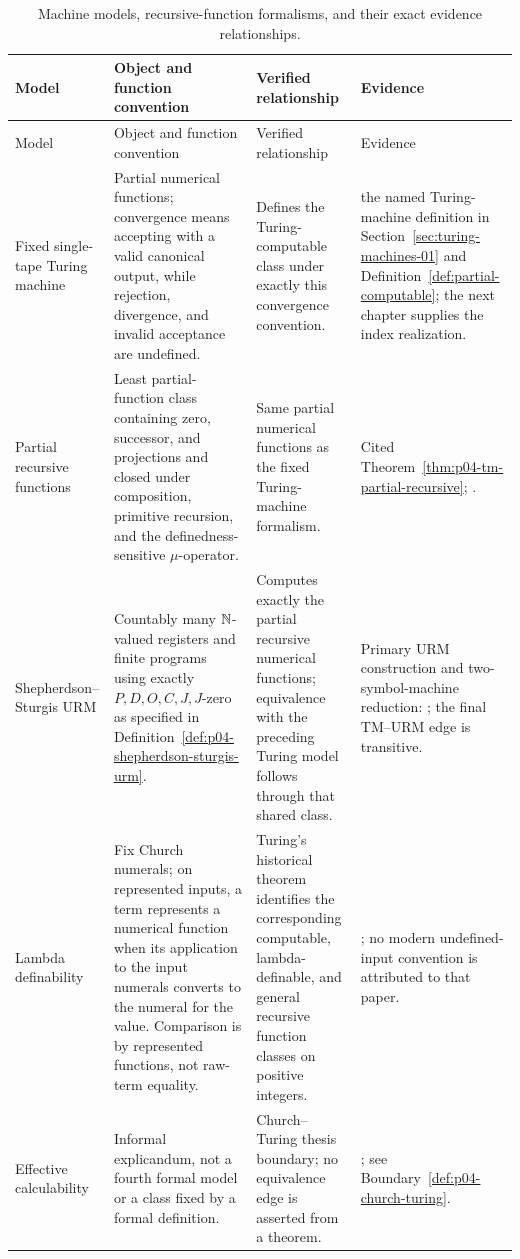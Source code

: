 \begin{landscape}
\begingroup\small\setlength{\tabcolsep}{3pt}
\begin{longtable}{@{}p{1.10in}p{2.25in}p{1.85in}p{1.84in}@{}}
\caption{Machine models, recursive-function formalisms, and their exact
evidence relationships.}
\label{tab:p04-machine-equivalences}\\
\toprule
Model & Object and function convention & Verified relationship & Evidence \\
\midrule
\endfirsthead
\toprule
Model & Object and function convention & Verified relationship & Evidence \\
\midrule
\endhead
Fixed single-tape Turing machine & Partial numerical functions; convergence
means accepting with a valid canonical output, while rejection, divergence,
and invalid acceptance are undefined. & Defines the Turing-computable class
under exactly this convergence convention. &
the named Turing-machine definition in Section~\ref{sec:turing-machines-01}
and Definition~\ref{def:partial-computable}; the next chapter supplies the index
realization. \\
\addlinespace
Partial recursive functions & Least partial-function class containing zero,
successor, and projections and closed under composition, primitive recursion,
and the definedness-sensitive \(\mu\)-operator. & Same partial numerical
functions as the fixed Turing-machine formalism. & Cited
Theorem~\ref{thm:p04-tm-partial-recursive};
\cite{Kleene1936,Kleene1952,Turing1937Lambda}. \\
\addlinespace
Shepherdson--Sturgis URM & Countably many \(\mathbb{N}\)-valued registers and finite
programs using exactly \(P,D,O,C,J,J\)-zero as specified in
Definition~\ref{def:p04-shepherdson-sturgis-urm}. & Computes exactly the
partial recursive numerical functions; equivalence with the preceding Turing
model follows through that shared class. & Primary URM construction and
two-symbol-machine reduction: \cite{ShepherdsonSturgis1963}; the final
TM--URM edge is transitive. \\
\addlinespace
Lambda definability & Fix Church numerals; on represented inputs, a term
represents a numerical function when its application to the input numerals
converts to the numeral for the value.  Comparison is by represented
functions, not raw-term equality. & Turing's historical theorem identifies the
corresponding computable, lambda-definable, and general recursive function
classes on positive integers. & \cite{Turing1937Lambda}; no modern
undefined-input convention is attributed to that paper. \\
\addlinespace
Effective calculability & Informal explicandum, not a fourth formal model or a
class fixed by a formal definition. & Church--Turing thesis boundary; no
equivalence edge is asserted from a theorem. &
\cite{Church1936,Turing1937Lambda,Soare1996ComputabilityRecursion}; see
Boundary~\ref{def:p04-church-turing}. \\
\bottomrule
\end{longtable}
\endgroup
\end{landscape}

